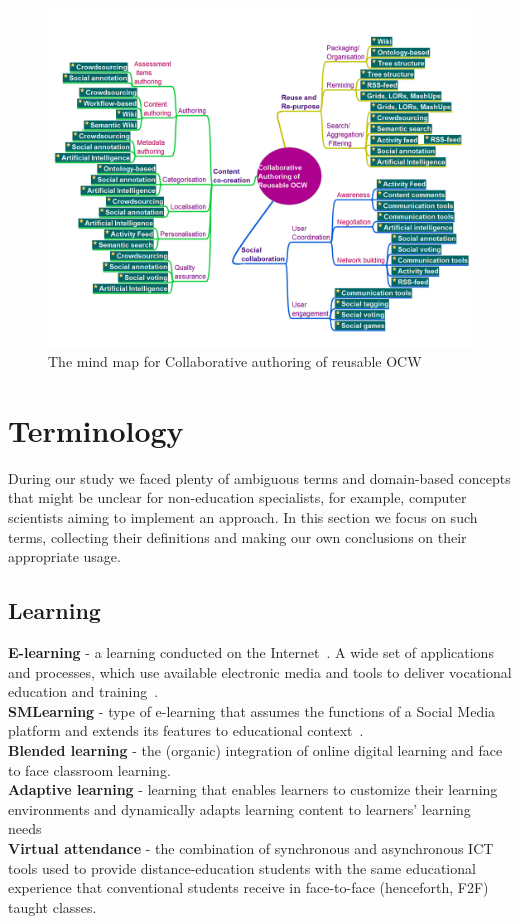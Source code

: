 \documentclass[ngerman,UKenglish,table]{scrbook}
\begin{document}
\begin{figure}[!ht]
  \centering
  \includegraphics[width=\textwidth]{images/super_map.png}
  \caption{The mind map for Collaborative authoring of reusable OCW}
  \label{fig:super_map}
\end{figure}

\section{Terminology}
\label{sec:Terminology}
During our study we faced plenty of ambiguous terms and domain-based concepts that might be unclear for non-education specialists, for example, computer scientists aiming to implement an approach.
In this section we focus on such terms, collecting their definitions and making our own conclusions on their appropriate usage.

\subsection{Learning}
\textbf{E-learning} - a learning conducted on the Internet~\cite{Dahlan2010}.
A wide set of applications and processes, which use available electronic media and tools
to deliver vocational education and training~\cite{de2009rss}.\\
\textbf{SMLearning} - type of e-learning that assumes the functions of a Social Media platform and extends its features to educational context~\cite{Claros2013}.\\
\textbf{Blended learning} - the (organic) integration of online digital learning and face to face classroom learning\cite{Cai2010}.\\
\textbf{Adaptive learning} - learning that enables learners to customize their learning environments and dynamically adapts learning content to learners' learning needs~\cite{brusilovsky2001adaptive}\\
\textbf{Virtual attendance} - the combination of synchronous and asynchronous ICT tools used to provide distance-education students with the same educational experience that conventional students receive in face-to-face (henceforth, F2F) taught classes.\\
\end{document}
